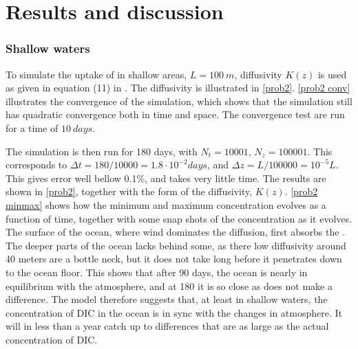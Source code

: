 \documentclass{article}
\begin{document}
    \section*{Results and discussion}
    \subsubsection*{Shallow waters}

    To simulate the uptake of  in shallow areas, $L=\SI{100}{m}$, diffusivity $K(z)$ is used as given in equation (11) in \cite{exercise}. The diffusivity is illustrated in \autoref{prob2}. \autoref{prob2 conv} illustrates the convergence of the simulation, which shows that the simulation still has quadratic convergence both in time and space. The convergence test are run for a time of $\SI{10}{days}$.

    The simulation is then run for 180 days, with $N_t = 10001, \, N_z = 100001$. This corresponds to $\Delta t = 180 / 10000 = 1.8 \cdot 10^{-2} \si{days}$, and $\Delta z = L/100000 = 10^{-5} L$. This gives error well bellow 0.1\%, and takes very little time. The results are shown in \autoref{prob2}, together with the form of the diffusivity, $K(z)$. \autoref{prob2 minmax} shows how the minimum and maximum concentration evolves as a function of time, together with some snap shots of the concentration as it evolves. The surface of the ocean, where wind dominates the diffusion, first absorbs the . The deeper parts of the ocean lacks behind some, as there low diffusivity around 40 meters are a bottle neck, but it does not take long before it penetrates down to the ocean floor. This shows that after 90 days, the ocean is nearly in equilibrium with the atmosphere, and at 180 it is so close as does not make a difference. The model therefore suggests that, at least in shallow waters, the concentration of DIC in the ocean is in sync with the changes in atmosphere. It will in less than a year catch up to differences that are as large as the actual concentration of DIC.
\end{document}
